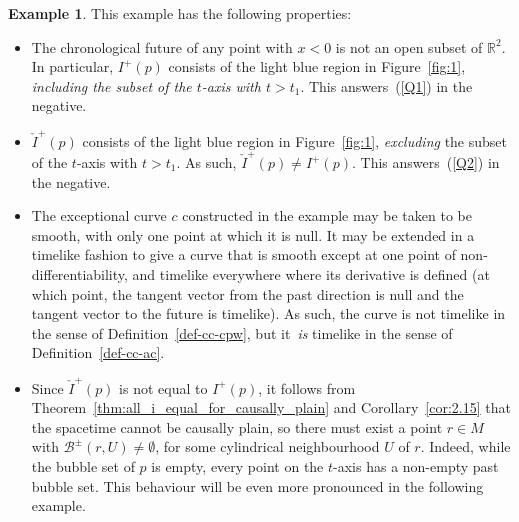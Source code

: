 \documentclass[reqno]{amsart}
\numberwithin{equation}{section}
\theoremstyle{plain}
\theoremstyle{definition}
\newtheorem{example}[theorem]{Example}
\theoremstyle{remark}
\newcommand\R{\ensuremath{\mathbb{R}}}
\begin{document}
\begin{example}
This example has the following properties: 
\begin{itemize}[itemsep=2mm]
\item The chronological future of any point with $x < 0$ is not an open subset of $\R^2$. In particular, $I^+(p)$ consists of the light blue region in Figure~\ref{fig:1}, \emph{including the subset of the $t$-axis with $t > t_1$}. This answers~(\ref{Q1}) in the negative. 
\item $\check{I}^+(p)$ consists of the light blue region in Figure~\ref{fig:1}, \emph{excluding\/} the subset of the $t$-axis with $t > t_1$. As such, $\check{I}^+(p) \neq I^+(p)$. This answers~(\ref{Q2}) in the negative. 
\item The exceptional curve $c$ constructed in the example may be taken to be smooth, with only one point at which it is null. It may be extended in a timelike fashion to give a curve that is smooth except at one point of non-differentiability, and timelike everywhere where its derivative is defined (at which point, the tangent vector from the past direction is null and the tangent vector to the future is timelike). As such, the curve is not timelike in the sense of Definition~\ref{def-cc-cpw}, but it~\emph{is\/} timelike in the sense of Definition~\ref{def-cc-ac}. 
\item Since $\check{I}^+(p)$ is not equal to $I^+(p)$, it follows from Theorem~\ref{thm:all_i_equal_for_causally_plain} and Corollary~\ref{cor:2.15} that the spacetime cannot be causally plain, so there must exist a point $r \in M$ with $\mathcal{B}^{\pm}(r, U) \neq \emptyset$, for some cylindrical neighbourhood $U$ of $r$. Indeed, while the bubble set of $p$ is empty, every point on the $t$-axis has a non-empty past bubble set. This behaviour will be even more pronounced in the following example. 
\end{itemize}
\end{example}
\end{document}
